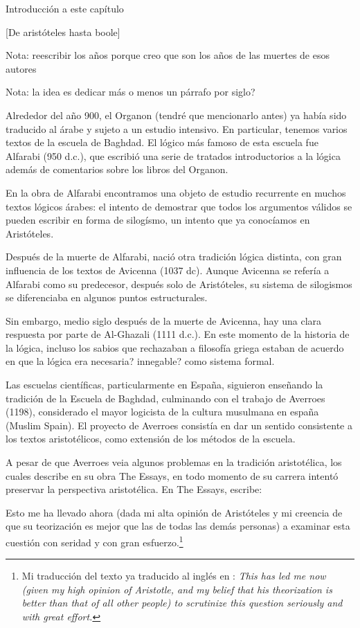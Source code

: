 \documentclass{article}
\begin{document}
Introducción a este capítulo

[De aristóteles hasta boole]

Nota: reescribir los años porque creo que son los años de las muertes de esos autores

Nota: la idea es dedicar más o menos un párrafo por siglo?

Alrededor del año 900, el Organon (tendré que mencionarlo antes) ya había sido traducido al árabe y sujeto a un estudio intensivo. En particular, tenemos varios textos de la escuela de Baghdad. El lógico más famoso de esta escuela fue Alfarabi (950 d.c.), que escribió una serie de tratados introductorios a la lógica además de comentarios sobre los libros del Organon.

En la obra de Alfarabi encontramos una objeto de estudio recurrente en muchos textos lógicos árabes: el intento de demostrar que todos los argumentos válidos se pueden escribir en forma de silogísmo, un intento que ya conocíamos en Aristóteles.

Después de la muerte de Alfarabi, nació otra tradición lógica distinta, con gran influencia de los textos de Avicenna (1037 dc). Aunque Avicenna se refería a Alfarabi como su predecesor, después solo de Aristóteles, su sistema de silogismos se diferenciaba en algunos puntos estructurales.

Sin embargo, medio siglo después de la muerte de Avicenna, hay una clara respuesta por parte de Al-Ghazali (1111 d.c.). En este momento de la historia de la lógica, incluso los sabios que rechazaban a filosofía griega estaban de acuerdo en que la lógica era necesaria? innegable? como sistema formal.

Las escuelas científicas, particularmente en España, siguieron enseñando la tradición de la Escuela de Baghdad, culminando con el trabajo de Averroes (1198), considerado el mayor logicista de la cultura musulmana en españa (Muslim Spain). El proyecto de Averroes consistía en dar un sentido consistente a los textos aristotélicos, como extensión de los métodos de la escuela.

A pesar de que Averroes veia algunos problemas en la tradición aristotélica, los cuales describe en su obra The Essays, en todo momento de su carrera intentó preservar la perspectiva aristotélica\cite{street2001arabic}. En The Essays, escribe:

\begin{displayquote}
    Esto me ha llevado ahora (dada mi alta opinión de Aristóteles y mi creencia de que su teorización es mejor que las de todas las demás personas) a examinar esta cuestión con seridad y con gran esfuerzo.\footnote{Mi traducción del texto ya traducido al inglés en \cite{street2001arabic}: \textit{This has led me now
    (given my high opinion of Aristotle, and my belief that his theorization is better than that of all other people) to scrutinize this question seriously and
    with great effort.}}
\end{displayquote}
\end{document}
